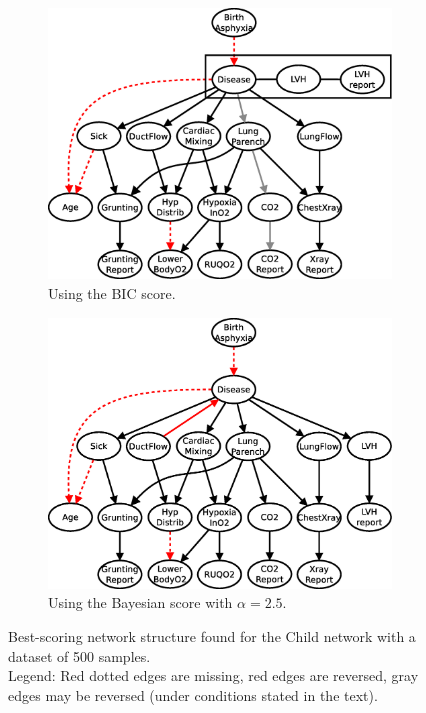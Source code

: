 \documentclass[english,cover]{fitthesis} %
\begin{document}
\begin{figure}[ht]
    \centering
    \begin{subfigure}[b]{0.45\linewidth}
        \hspace{-1.3cm}
        \includegraphics[scale=0.35]{fig/structure-learning-child-500-bic}
        \caption{Using the BIC score.}
        \label{fig:structure-learning-child-500-bic}
    \end{subfigure}
    \begin{subfigure}[b]{0.45\linewidth}
        \hspace{-0.4cm}
        \includegraphics[scale=0.35]{fig/structure-learning-child-500-bayes-2_5}
        \caption{Using the Bayesian score with $\alpha = 2.5$.}
        \label{fig:structure-learning-child-500-bayes-2_5}
    \end{subfigure}
    \caption{Best-scoring network structure found for the Child network with a dataset of 500 samples.
    \\Legend: Red dotted edges are missing, red edges are reversed, gray edges may be reversed (under conditions stated in the text).}
\end{figure}
\end{document}
